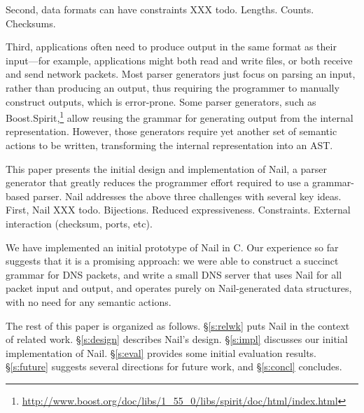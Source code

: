 Second, data formats can have constraints XXX todo.
Lengths.
Counts.
Checksums.

Third, applications often need to produce output in the same
format as their input---for example, applications might both
read and write files, or both receive and send network packets.
Most parser generators just focus on parsing an input, rather
than producing an output, thus requiring the programmer to manually
construct outputs, which is error-prone.  Some parser generators, such as
Boost.Spirit,\footnote{\url{http://www.boost.org/doc/libs/1_55_0/libs/spirit/doc/html/index.html}}
allow reusing the grammar for generating output from the internal
representation.  However, those generators require yet another set of
semantic actions to be written, transforming the internal representation
into an AST\@.

This paper presents the initial design and implementation of Nail, a
parser generator that greatly reduces the programmer effort required to
use a grammar-based parser.  Nail addresses the above three challenges
with several key ideas.  First, Nail XXX todo.  Bijections.  Reduced
expressiveness.  Constraints.  External interaction (checksum, ports,
etc).

We have implemented an initial prototype of Nail in C\@.  Our experience
so far suggests that it is a promising approach: we were able to construct
a succinct grammar for DNS packets, and write a small DNS server that
uses Nail for all packet input and output, and operates purely on
Nail-generated data structures, with no need for any semantic actions.

The rest of this paper is organized as follows.  \S\ref{s:relwk}
puts Nail in the context of related work.  \S\ref{s:design} describes
Nail's design.  \S\ref{s:impl} discusses our initial implementation
of Nail.  \S\ref{s:eval} provides some initial evaluation results.
\S\ref{s:future} suggests several directions for future work, and
\S\ref{s:concl} concludes.

